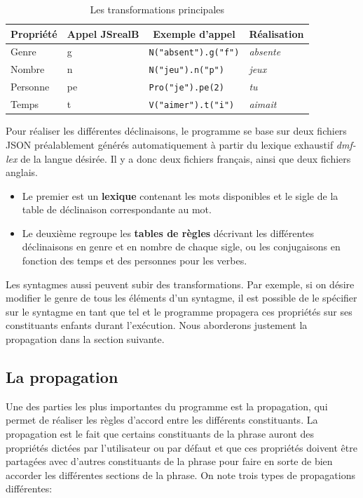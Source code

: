 \documentclass[11pt]{article} %
\newcommand{\system}[1]{\textsf{#1}}
\newcommand{\JSB}{\system{JSrealB}}
\newcommand{\real}[1]{\emph{#1}}
\begin{document}
\begin{table}[ht]
\centering
\caption{Les transformations principales}
\label{tab:transfoTable}
\begin{tabular}{|l|l|l|l|}
\hline 
\multicolumn{1}{|c}{Propriété} & \multicolumn{1}{|c}{Appel \JSB{}} & \multicolumn{1}{|c}{Exemple d'appel} & \multicolumn{1}{|c|}{Réalisation} \\
\hline 
\hline 
Genre & g & \texttt{N("absent").g("f")} & \real{absente}\\
\hline 
Nombre & n & \texttt{N("jeu").n("p")} & \real{jeux}\\
\hline 
Personne & pe & \texttt{Pro("je").pe(2)} & \real{tu}\\
\hline 
Temps & t & \texttt{V("aimer").t("i")} & \real{aimait}\\
\hline 
\end{tabular}
\end{table}


Pour réaliser les différentes déclinaisons, le programme se base sur
deux fichiers JSON préalablement générés automatiquement à partir du 
lexique exhaustif \emph{dmf-lex} de la langue désirée. Il y a donc deux fichiers 
français, ainsi que deux fichiers anglais. 
\begin{itemize}
\item Le premier
est un \textbf{lexique} contenant les mots disponibles et le sigle de la table
de déclinaison correspondante au mot. 
\item Le deuxième regroupe les \textbf{tables
de règles} décrivant les différentes déclinaisons en genre et en nombre
de chaque sigle, ou les conjugaisons en fonction des temps et des
personnes pour les verbes.
\end{itemize}

Les syntagmes aussi peuvent subir des transformations. Par exemple,
si on désire modifier le genre de tous les éléments d'un syntagme,
il est possible de le spécifier sur le syntagme en tant que tel et
le programme propagera ces propriétés sur ses constituants enfants
durant l'exécution. Nous aborderons justement la propagation dans
la section suivante.

\subsection{La propagation}

Une des parties les plus importantes du programme est la propagation,
qui permet de réaliser les règles d'accord entre les différents constituants.
La propagation est le fait que certains constituants de la phrase
auront des propriétés dictées par l'utilisateur ou par défaut et que
ces propriétés doivent être partagées avec d'autres constituants de
la phrase pour faire en sorte de bien accorder les différentes sections
de la phrase. On note trois types de propagations différentes:
\end{document}
